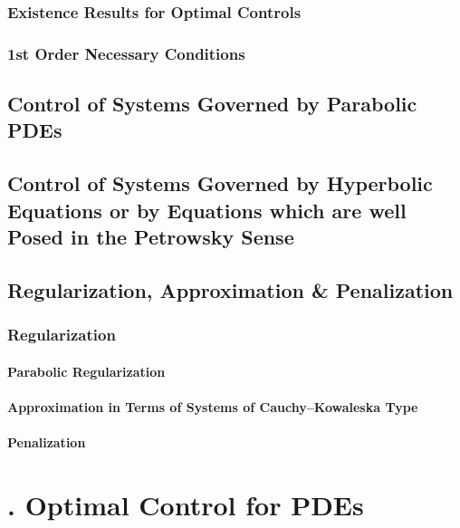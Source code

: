 \documentclass[oneside]{book}
\numberwithin{equation}{section}
\begin{document}
\subsection{Existence Results for Optimal Controls}

\subsection{1st Order Necessary Conditions}

\section{Control of Systems Governed by Parabolic PDEs}

\section{Control of Systems Governed by Hyperbolic Equations or by Equations which are well Posed in the Petrowsky Sense}

\section{Regularization, Approximation \& Penalization}

\subsection{Regularization}

\subsubsection{Parabolic Regularization}

\subsubsection{Approximation in Terms of Systems of Cauchy--Kowaleska Type}

\subsubsection{Penalization}


\chapter{\cite{Troltzsch2010}. Optimal Control for PDEs}
\end{document}
